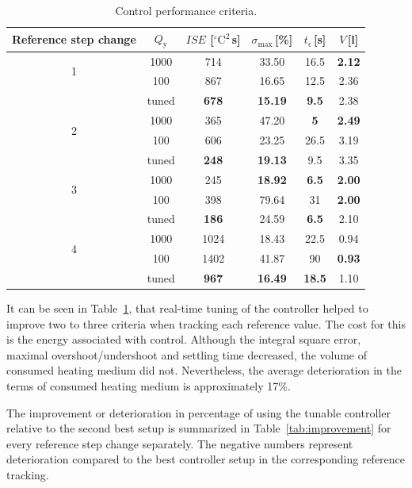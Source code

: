 \documentclass[preprint,12pt]{elsarticle}
\begin{document}
\begin{table}[h!]
	\begin{center}
		\caption{Control performance criteria.}
		\label{tab:control_performance}
		\begin{tabular}{c|c|c|c|c|c} 
			Reference step change & $Q_\mathrm{y}$ & $ISE$ [$^{\circ}\mathrm{C}^2$\,s] & $\sigma_{\mathrm{max}}$\,[\%] & $t_{\epsilon}$\,[s] & $V$\,[l] \\
			\hline
			\multirow{2}{*}{1} & 1000 & 714 & 33.50 & 16.5 & \textbf{2.12} \\
			    & 100 & 867 & 16.65 & 12.5 & 2.36 \\ 
			    & tuned & \textbf{678} & \textbf{15.19} & \textbf{9.5} & 2.38 \\ 
			\hline
			\multirow{2}{*}{2} & 1000 & 365 & 47.20 & \textbf{5} & \textbf{2.49} \\
			    & 100 & 606 & 23.25 & 26.5 & 3.19 \\ 
			    & tuned & \textbf{248} & \textbf{19.13} & 9.5 & 3.35 \\ 
			\hline
		    \multirow{2}{*}{3} & 1000 & 245 & \textbf{18.92} & \textbf{6.5} & \textbf{2.00} \\
				& 100 & 398 & 79.64 & 31 & \textbf{2.00} \\ 
				& tuned & \textbf{186} & 24.59 & \textbf{6.5} & 2.10 \\ 
			\hline
			\multirow{2}{*}{4} & 1000 & 1024 & 18.43 & 22.5 & 0.94 \\
				& 100 & 1402 & 41.87 & 90 & \textbf{0.93} \\ 
				& tuned & \textbf{967} & \textbf{16.49} & \textbf{18.5} & 1.10  
		\end{tabular}
	\end{center}
\end{table}

It can be seen in Table~\ref{tab:control_performance}, that real-time tuning of the controller helped to improve two to three criteria when tracking each reference value. The cost for this is the energy associated with control. Although the integral square error, maximal overshoot/undershoot and settling time decreased, the volume of consumed heating medium did not. Nevertheless, the average deterioration in the terms of consumed heating medium is approximately 17\%. 

The improvement or deterioration in percentage of using the tunable controller relative to the second best setup is summarized in Table~\ref{tab:improvement} for every reference step change separately. The negative numbers represent deterioration compared to the best controller setup in the corresponding reference tracking. 
\end{document}
